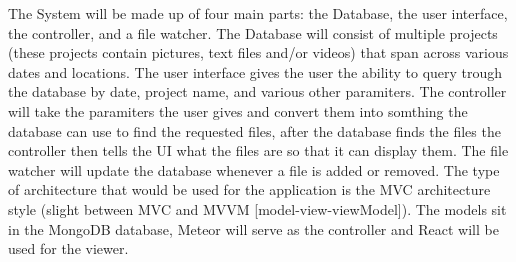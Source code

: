     The System will be made up of four main parts: the Database, the user interface, the controller, and a file watcher. The Database will consist of multiple projects (these projects contain pictures, text files and/or videos) that span across various dates and locations. The user interface gives the user the ability to query trough the database by date, project name, and various other paramiters. The controller will take the paramiters the user gives and convert them into somthing the database can use to find the requested files, after the database finds the files the controller then tells the UI what the files are so that it can display them. The file watcher will update the database whenever a file is added or removed.
    The type of architecture that would be used for the application is the MVC architecture style (slight between MVC and MVVM [model-view-viewModel]). The models sit in the MongoDB database, Meteor will serve as the controller and React will be used for the viewer.
